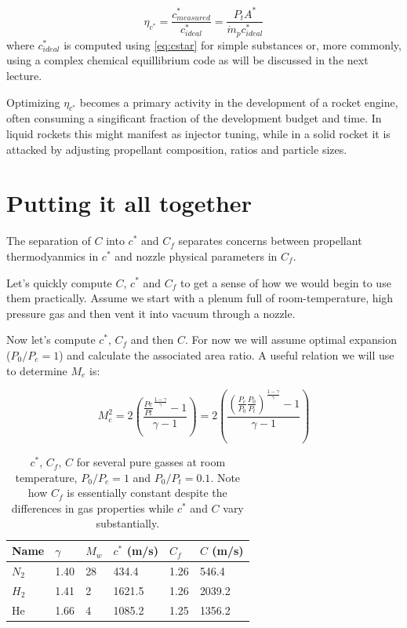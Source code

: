 \documentclass[twocolumn]{memoir} %
\begin{document}
\begin{equation}
    \eta_{c^*} = \frac{c^*_{measured}}{c^*_{ideal}} = \frac{P_t A^*}{\dot{m}_p c^*_{ideal}}
\end{equation}
%
where $c^*_{ideal}$ is computed using \cref{eq:cstar} for simple substances or, more
commonly, using a complex chemical equillibrium code as will be discussed in the next
lecture.

Optimizing $\eta_{c^*}$ becomes a primary activity in the development of a rocket
engine, often consuming a singificant fraction of the development budget and time.  In
liquid rockets this might manifest as injector tuning, while in a solid rocket it is
attacked by adjusting propellant composition, ratios and particle sizes.

\section{Putting it all together}\label{putting-it-all-together}

The separation of \(C\) into \(c^*\) and \(C_f\) separates
concerns between propellant thermodyanmics in \(c^*\) and nozzle
physical parameters in \(C_f\).

Let's quickly compute \(C\), \(c^*\) and \(C_f\) to get a sense of
how we would begin to use them practically. Assume we start with a
plenum full of room-temperature, high pressure gas and then vent it
into vacuum through a nozzle. 

Now let's compute \(c^*\), \(C_f\) and then \(C\). For now we will
assume optimal expansion ($P_0/P_e = 1$) and calculate the associated area ratio. A
useful relation we will use to determine \(M_e\) is:

\begin{equation}
    M_e^2 = 2\left(\frac{\frac{Pe}{Pt}^{\frac{1-\gamma}{\gamma}}-1}{\gamma-1}\right) = 2\left(\frac{\left(\frac{P_e}{P_0}\frac{P_0}{P_t}\right)^{\frac{1-\gamma}{\gamma}}-1}{\gamma-1}\right)
\end{equation}

\begin{table}[h]
\centering
\begin{tabular}{llllll}
\toprule
Name & $\gamma$ & $M_w$ & $c^*$ (m/s) & $C_f$ & $C$ (m/s) \\
\midrule
$N_2$ & 1.40 & 28 & 434.4 & 1.26 & 546.4 \\
$H_2$ & 1.41 & 2 & 1621.5 & 1.26 & 2039.2 \\
He & 1.66 & 4 & 1085.2 & 1.25 & 1356.2 \\

\bottomrule
\end{tabular}
        
\caption{$c^*$, $C_f$, $C$ for several pure gasses at room temperature,
        $P_0/P_e = 1$ and $P_0/P_t = 0.1$. Note how $C_f$ is essentially
        constant despite the differences in gas properties while $c^*$ and
        $C$ vary substantially.}    

\end{table}
\end{document}
